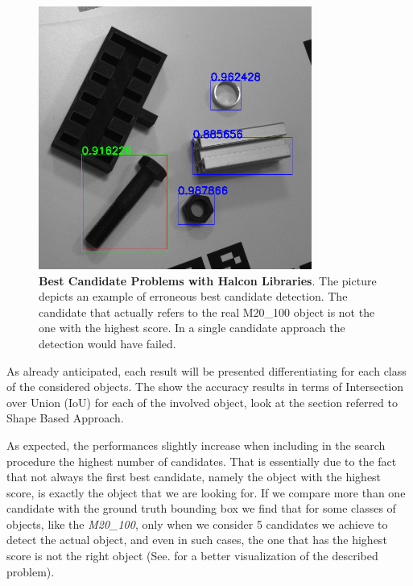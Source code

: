 \begin{figure}
    \centering
    \includegraphics[width=0.8\textwidth]{figures/4_experiments/m20_100_halcon_detection_problems}
    \caption{\textbf{Best Candidate Problems with Halcon Libraries}. The picture depicts an example of erroneous best candidate detection. The candidate that actually refers to the real M20\_100 object is not the one with the highest score. In a single candidate approach the detection would have failed.}
    \label{fig:m20_100_halcon_detection_problems}
\end{figure}

As already anticipated, each result will be presented differentiating for each class of the considered objects. The  show the accuracy results in terms of Intersection over Union (IoU) for each of the involved object, look at the section referred to Shape Based Approach.

As expected, the performances slightly increase when including in the search procedure the highest number of candidates. That is essentially due to the fact that not always the first best candidate, namely the object with the highest score, is exactly the object that we are looking for. If we compare more than one candidate with the ground truth bounding box we find that for some classes of objects, like the \emph{M20\_100}, only when we consider 5 candidates we achieve to detect the actual object, and even in such cases, the one that has the highest score is not the right object (See.  for a better visualization of the described problem).

